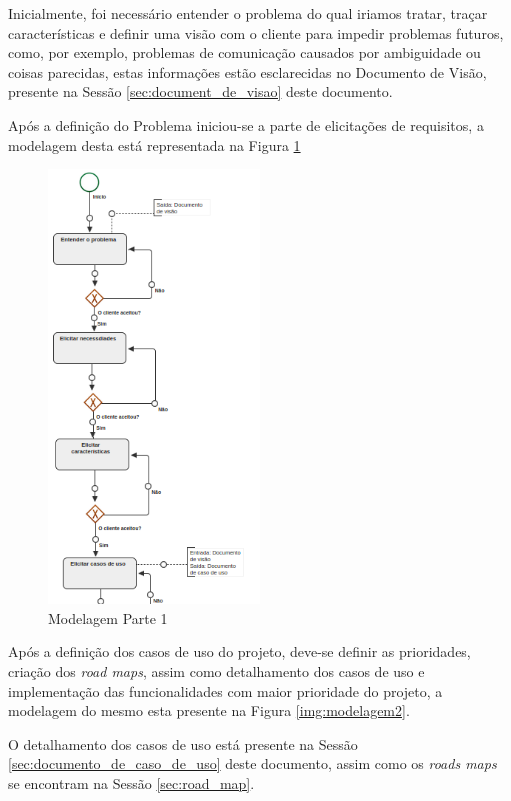 
Inicialmente, foi necessário entender o problema do qual iriamos tratar, traçar características e definir uma visão com o cliente para impedir problemas futuros, como, por exemplo, problemas de comunicação causados por ambiguidade ou coisas parecidas, estas informações estão esclarecidas no Documento de Visão, presente na Sessão \ref{sec:document_de_visao} deste documento.

Após a definição do Problema iniciou-se a parte de elicitações de requisitos, a modelagem desta está representada na Figura \ref{img:modelagem1}

\begin{figure}[H]
	\centering
	\includegraphics[width=0.5\textwidth]{imgModelagem/modelagem1}
	\caption{Modelagem Parte 1}
	\label{img:modelagem1}
\end{figure}

Após a definição dos casos de uso do projeto, deve-se definir as prioridades, criação dos \textit{road maps}, assim como detalhamento dos casos de uso e implementação das funcionalidades com maior prioridade do projeto, a modelagem do mesmo esta presente na Figura \ref{img:modelagem2}.

O detalhamento dos casos de uso está presente na Sessão \ref{sec:documento_de_caso_de_uso} deste documento, assim como os \textit{roads maps} se encontram na Sessão \ref{sec:road_map}.


